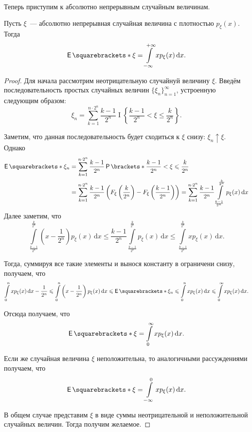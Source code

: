 Теперь приступим к абсолютно непрерывным случайным величинам.
\begin{theorem}
	Пусть \(\xi\)~--- абсолютно непрерывная случайная величина с плотностью \(p_{\xi}(x)\). Тогда
	\[
	\E{\xi} = \int\limits_{-\infty}^{+\infty} xp_{\xi}(x)\,\mathrm{d}x.
	\]
\end{theorem}
\begin{proof}
	Для начала рассмотрим неотрицательную случайнуй величину \(\xi\). Введём последовательность простых случайных величин \(\{\xi_n\}_{n = 1}^{\infty}\), устроенную следующим образом:
	\[
	\xi_n = \sum\limits_{k = 1}^{n \cdot 2^n} \frac{k - 1}{2^n}\mathop{I}\left\{\frac{k - 1}{2^n} < \xi \leq \frac{k}{2^n}\right\}.
	\]
	
	Заметим, что данная последовательность будет сходиться к \(\xi\) снизу: \(\xi_n \uparrow \xi\). Однако
	\begin{align}
		\E{\xi_n} &= \sum\limits_{k = 1}^{n \cdot 2^n} \frac{k - 1}{2^n}\Pr{\frac{k - 1}{2^n} < \xi \leq \frac{k}{2^n}} \\
		&= \sum\limits_{k = 1}^{n \cdot 2^n} \frac{k - 1}{2^n}\left(F_{\xi}\left(\frac{k}{2^n}\right) - F_{\xi}\left(\frac{k - 1}{2^n}\right)\right) = \sum\limits_{k = 1}^{n \cdot 2^n} \frac{k - 1}{2^n}\int\limits_{\frac{k - 1}{2^n}}^{\frac{k}{2^n}} p_{\xi}(x)\,\mathrm{d}x
	\end{align}
	Далее заметим, что
	\[
	\int\limits_{\frac{k - 1}{2^n}}^{\frac{k}{2^n}} \left(x - \frac{1}{2^n}\right) p_{\xi}(x)\,\mathrm{d}x \leq \frac{k - 1}{2^n}\int\limits_{\frac{k - 1}{2^n}}^{\frac{k}{2^n}} p_{\xi}(x)\,\mathrm{d}x \leq \int\limits_{\frac{k - 1}{2^n}}^{\frac{k}{2^n}} xp_{\xi}(x)\,\mathrm{d}x.
	\]
	
	Тогда, суммируя все такие элементы и вынося константу в ограничени снизу, получаем, что
	\[
	\int\limits_{0}^{n} xp_{\xi}(x)\,\mathrm{d}x - \frac{1}{2^n} \leq \int\limits_{0}^{n} \left(x - \frac{1}{2^n}\right) p_{\xi}(x)\,\mathrm{d}x \leq \E{\xi_n} \leq \int\limits_{0}^{n} xp_{\xi}(x)\,\mathrm{d}x \leq \int\limits_{0}^{\infty} xp_{\xi}(x)\,\mathrm{d}x.
	\]
	
	Отсюда получаем, что 
	\[
	\E{\xi} = \int\limits_{0}^{\infty} xp_{\xi}(x)\,\mathrm{d}x.
	\]
	
	Если же случайная величина \(\xi\) неположительна, то аналогичными рассуждениями получаем, что
	\[
	\E{\xi} = \int\limits_{-\infty}^{0} xp_{\xi}(x)\,\mathrm{d}x.
	\]
	
	В общем случае представим \(\xi\) в виде суммы неотрицательной и неположительной случайных величин. Тогда получим желаемое.
\end{proof}

